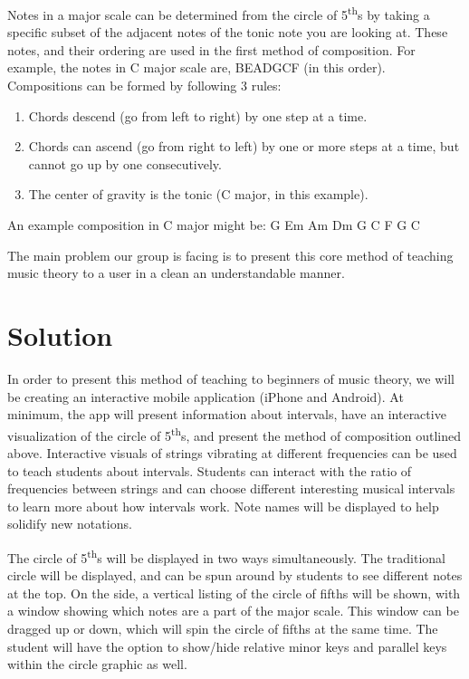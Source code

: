 \documentclass[onecolumn, draftclsnofoot,10pt, compsoc]{IEEEtran}
\begin{document}
    \par
    Notes in a major scale can be determined from the circle of 5\textsuperscript{th}s by taking a specific subset of the adjacent notes of the tonic note you are looking at. 
    These notes, and their ordering are used in the first method of composition. For example, the notes in C major scale are, BEADGCF (in this order). 
    Compositions can be formed by following 3 rules:
    
    \begin{enumerate}
    \item Chords descend (go from left to right) by one step at a time.
    \item Chords can ascend (go from right to left) by one or more steps at a time, but cannot go up by one consecutively.
    \item The center of gravity is the tonic (C major, in this example).
    \end{enumerate}
    
    An example composition in C major might be: G Em Am Dm G C F G C
    
    \par
    The main problem our group is facing is to present this core method of teaching music theory to a user in a clean an understandable manner.
    
    \clearpage
    
    \section{Solution}
    In order to present this method of teaching to beginners of music theory, we will be creating an interactive mobile application (iPhone and Android).
    At minimum, the app will present information about intervals, have an interactive visualization of the circle of 5\textsuperscript{th}s, and present the method of composition outlined above.
    Interactive visuals of strings vibrating at different frequencies can be used to teach students about intervals.
    Students can interact with the ratio of frequencies between strings and can choose different interesting musical intervals to learn more about how intervals work.
    Note names will be displayed to help solidify new notations.
    
    \par
    The circle of 5\textsuperscript{th}s will be displayed in two ways simultaneously.
    The traditional circle will be displayed, and can be spun around by students to see different notes at the top.
    On the side, a vertical listing of the circle of fifths will be shown, with a window showing which notes are a part of the major scale.
    This window can be dragged up or down, which will spin the circle of fifths at the same time.
    The student will have the option to show/hide relative minor keys and parallel keys within the circle graphic as well.
    
\end{document}

